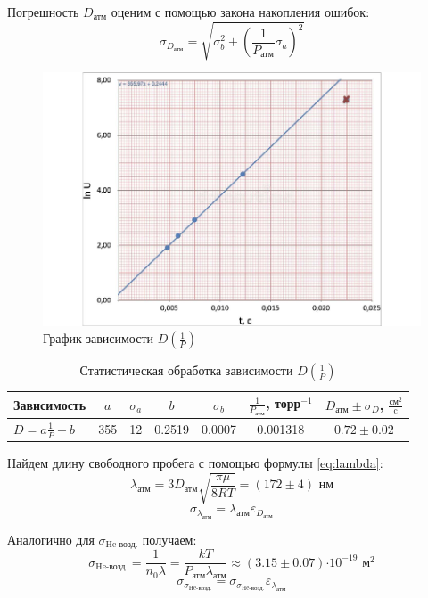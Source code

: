 \documentclass[12pt,a4paper]{article}
\newcommand{\e}[1]{\text{$\cdot10^{#1}$}}
\begin{document}
Погрешность $D_\text{атм}$ оценим с помощью закона накопления ошибок:
$$\sigma_{D_\text{атм}} = \sqrt{\sigma_b^2 + \left(\frac{1}{P_\text{атм}}\sigma_a\right)^2}$$




\begin{figure}[H]
	\centering
	\includegraphics[width=1\linewidth]{res/D_1P}
	\caption{График зависимости $D(\frac{1}{P})$}
	\label{fig:d1p}
\end{figure}

\begin{table}[H]
	\centering
	\caption{Статистическая обработка зависимости $D(\frac{1}{P})$}
	\label{tab:d1p}
	\footnotesize
	\begin{tabular}{lcccccc}
		\toprule
		Зависимость & $a$ & $\sigma_a$ & $b$ & $\sigma_b$ & $\frac{1}{P_\text{атм}}$, торр$^{-1}$ & $D_\text{атм}\pm\sigma_D$, $\frac{\text{см}^2}{\text{c}}$\\
		\midrule
		$D = a\frac{1}{P} + b$  &  355 & 12 &  0.2519 & 0.0007 & 0.001318 & $0.72\pm 0.02$ \\
		\bottomrule
	\end{tabular}
\end{table}
\clearpage
Найдем длину свободного пробега с помощью формулы \ref{eq:lambda}:
$$\lambda_{\text{атм}} = 3 D_\text{атм} \sqrt{\frac{\pi \mu}{8RT}} = (172 \pm 4) \text{ нм}$$
$$\sigma_{\lambda_{\text{атм}}} = \lambda_{\text{атм}} \varepsilon_{D_\text{атм}}$$

Аналогично для $\sigma_{\text{He-возд.}}$ получаем:
$$\sigma_{\text{He-возд.}} = \frac{1}{n_0\lambda} = \frac{kT}{P_\text{атм}\lambda_{\text{атм}}} \approx (3.15 \pm 0.07)\e{-19} \text{ м}^2$$
$$ \sigma_{\sigma_{\text{He-возд.}}} = \sigma_{\sigma_{\text{He-возд.}}}\varepsilon_{\lambda_{\text{атм}}}$$
\end{document}
